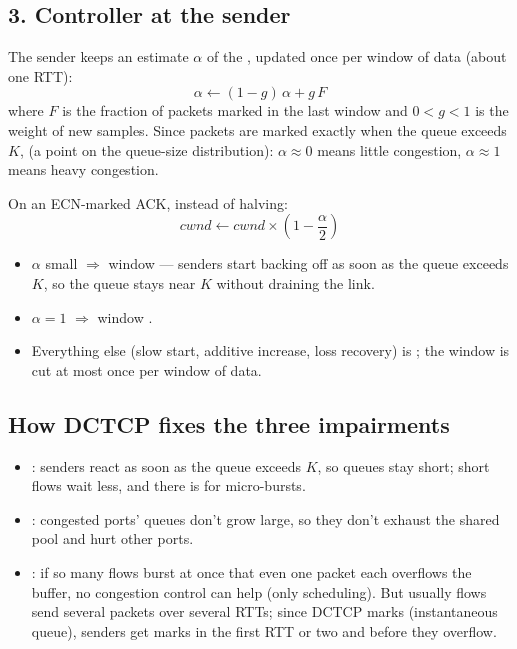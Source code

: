 \subsection{3. Controller at the sender}
The sender keeps an estimate $\alpha$ of the , updated once per window of data (about one RTT):
\[ \alpha \leftarrow (1-g)\,\alpha + g\,F \]
where $F$ is the fraction of packets marked in the last window and $0<g<1$ is the weight of new samples. Since packets are marked exactly when the queue exceeds $K$,  (a point on the queue-size distribution): $\alpha\approx 0$ means little congestion, $\alpha\approx 1$ means heavy congestion.

On an ECN-marked ACK, instead of halving:
\[ cwnd \leftarrow cwnd \times \left(1 - \frac{\alpha}{2}\right) \]
\begin{itemize}
\item $\alpha$ small $\Rightarrow$ window  --- senders start backing off  as soon as the queue exceeds $K$, so the queue stays near $K$ without draining the link.
\item $\alpha = 1$ $\Rightarrow$ window .
\item Everything else (slow start, additive increase, loss recovery) is ; the window is cut at most once per window of data.
\end{itemize}

\subsection{How DCTCP fixes the three impairments}
\begin{itemize}
\item {}: senders react as soon as the queue exceeds $K$, so queues stay short; short flows wait less, and there is  for micro-bursts.
\item {}: congested ports' queues don't grow large, so they don't exhaust the shared pool and hurt other ports.
\item {}: if so many flows burst at once that even one packet each overflows the buffer, no congestion control can help (only scheduling). But usually flows send several packets over several RTTs; since DCTCP marks  (instantaneous queue), senders get marks in the first RTT or two and  before they overflow.
\end{itemize}

